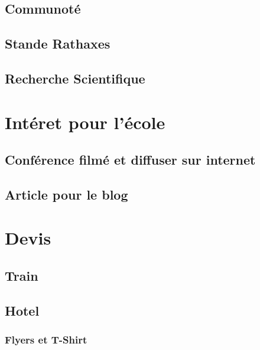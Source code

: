 \documentclass{rtxreport}
\begin{document}
\section{Communoté}

\section{Stande Rathaxes}


\section{Recherche Scientifique}

\chapter{Intéret pour l'école}
\section{Conférence filmé et diffuser sur internet}
\section{Article pour le blog}


\chapter{Devis}
\section{Train}
\section{Hotel}


\subsection{Flyers et T-Shirt}




\end{document}
